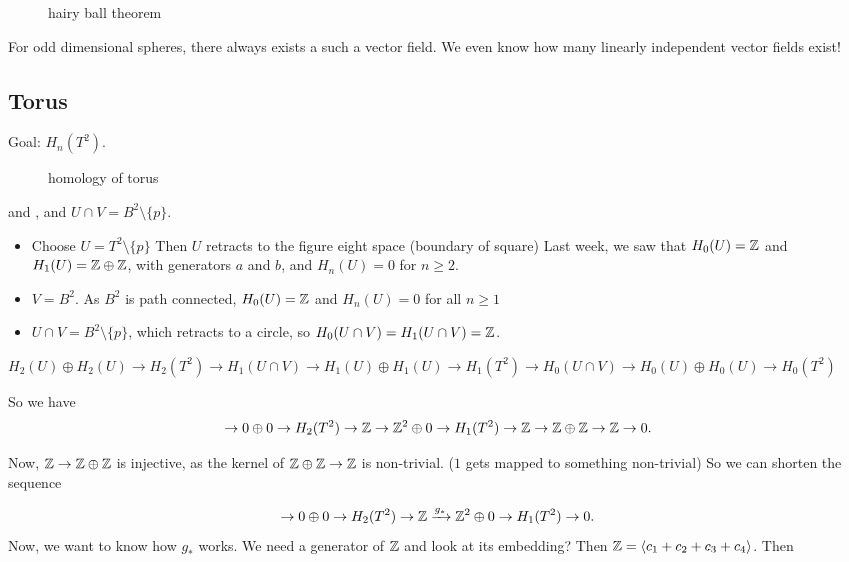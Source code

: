 \begin{figure}[H]
    \centering
    \caption{hairy ball theorem}
    \label{fig:hairy-ball-theorem}
\end{figure}
\begin{remark}
    For odd dimensional spheres, there always exists a such a vector field.
    We even know how many linearly independent vector fields exist!
\end{remark}

\hr


\subsection*{Torus}
Goal: $H_n(T^2)$.

\begin{figure}[H]
    \centering
    \caption{homology of torus}
    \label{fig:homology-of-torus}
\end{figure}

 and , and $U \cap V = B^2 \setminus \{ p\} $.

\begin{itemize}
    \item Choose $U = T^2 \setminus \{p\} $
        Then $U$ retracts to the figure eight space (boundary of square)
        Last week, we saw that $H_0(U) = \mathbb{Z}$ and $H_1(U) = \mathbb{Z} \oplus \mathbb{Z}$, with generators $a$ and $b$, and $H_n(U) = 0$ for $n \ge 2$.
    \item  $V = B^2$. As $B^2$ is path connected, $H_0(U) = \mathbb{Z} $ and $H_n(U) = 0$ for all  $n \ge  1$
    \item $U \cap  V = B^2 \setminus \{ p\} $, which retracts to a circle, so $H_0(U \cap V) = H_1(U \cap  V) = \mathbb{Z}$.
\end{itemize}

\centerline{$
            H_2(U) \oplus H_2(U) \to  H_2(T^2) \to  H_1(U \cap V) \to  H_1(U) \oplus H_1(U) \to  H_1(T^2) \to  H_0(U \cap  V) \to  H_0(U) \oplus H_0(U) \to  H_0(T^2)
        $}
    So we have
    \[
        \to  0 \oplus 0 \to  H_2(T^2) \to  \mathbb{Z} \to  \mathbb{Z}^2 \oplus 0 \to  H_1(T^2) \to  \mathbb{Z} \to  \mathbb{Z} \oplus \mathbb{Z} \to  \mathbb{Z} \to  0
    .\] 

    Now, $\mathbb{Z} \to \mathbb{Z} \oplus \mathbb{Z}$ is injective, as the kernel of $\mathbb{Z}\oplus \mathbb{Z} \to  \mathbb{Z}$ is non-trivial. ($1$ gets mapped to something non-trivial)
    So we can shorten the sequence

    \[
        \to  0 \oplus 0 \to  H_2(T^2) \to  \mathbb{Z} \xrightarrow{g_*}   \mathbb{Z}^2 \oplus 0 \to  H_1(T^2) \to  0
    .\] 
    Now, we want to know how $g_*$ works.
    We need a generator of $\mathbb{Z}$ and look at its embedding?
    Then $\mathbb{Z} = \left<c_1 + c_2 + c_3 + c_4 \right>$.
    Then

